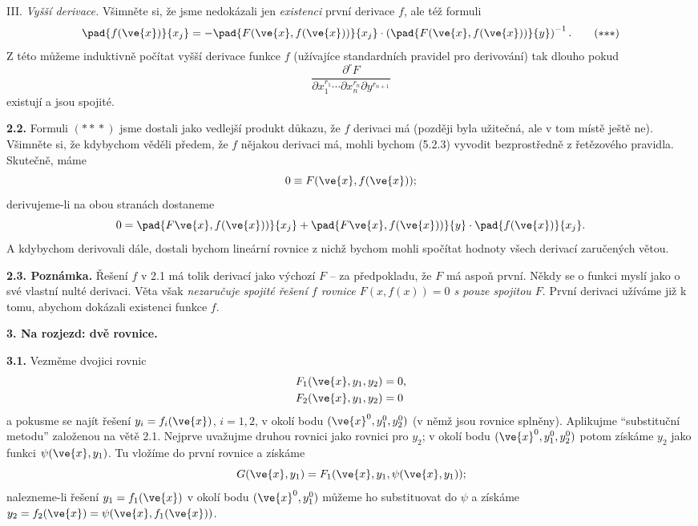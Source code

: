 \documentclass[12pt]{article}
\begin{document}
{\smallskip

III. {\em Vyšší derivace.} Všimněte si, že jsme nedokázali jen 
 {\em existenci} první derivace
 $f$, ale též formuli
\begin{equation}
\pad{f(\ve{x})}{x_j}=-\pad{F(\ve{x},f(\ve{x}))}{x_j}\cdot\left(\pad{F(\ve{x},f(\ve{x}))}{y}\right)^{-1}. \tag{${**}*$}
\end{equation}
Z této můžeme induktivně počítat vyšší derivace funkce $f$ (užívajíce standardních pravidel pro derivování) 
tak dlouho pokud
$$\frac{\partial^r F}{\partial x_1^{r_1}\cdots\partial x_n^{r_n}\partial y^{r_{n+1}}}$$ 
existují a jsou spojité. \sq

\bigskip 

{\bf 2.2.} Formuli \hbox{$({**}*)$} jsme dostali jako vedlejší produkt důkazu, že $f$ derivaci má (později byla užitečná, ale v tom místě ještě ne). Všimněte si, že kdybychom věděli předem, že 
 $f$ nějakou derivaci má, mohli bychom (5.2.3) vyvodit bezprostředně z řetězového pravidla. Skutečně, máme
$$
0\equiv F(\ve{x},f(\ve{x}));
$$
derivujeme-li na obou stranách dostaneme
$$
0=\pad{F\ve{x},f(\ve{x}))}{x_j}+\pad{F\ve{x},f(\ve{x}))}{y}\cdot\pad{f(\ve{x})}{x_j}.
$$
A kdybychom derivovali dále, dostali  bychom lineární rovnice z nichž bychom mohli spočítat
 hodnoty všech derivací zaručených větou.

\medskip


{\bf 2.3. Poznámka.} Řešení $f$ v 2.1  
má tolik derivací jako výchozí $F$ -- za předpokladu, že $F$ má aspoň první.
Někdy se o funkci myslí jako o své vlastní nulté derivaci. 
 Věta však  {\em nezaručuje
spojité řešení $f$ rovnice $F(x,f(x))=0$ s pouze spojitou $F$}. 
První derivaci užíváme již k tomu, abychom dokázali existenci funkce $f$.




 \vskip10mm
 
  
 {\large\bf 3. Na rozjezd: dvě rovnice.}
 
 \bigskip
 
{\bf 3.1.}
 Vezměme dvojici rovnic
$$
\begin{aligned}
&F_1(\ve{x},y_1,y_2)=0,\\
&F_2(\ve{x},y_1,y_2)=0
\end{aligned}
$$
a pokusme se najít řešení $y_i=f_i(\ve{x})$, $i=1,2$,
v okolí bodu $(\ve{x}^0,y^0_1,y^0_2)$ (v němž jsou rovnice splněny). 
Aplikujme ``substituční metodu'' založenou na větě 2.1. 
Nejprve uvažujme druhou rovnici jako rovnici pro
 $y_2$; v okolí bodu $(\ve{x}^0,y_1^0,y_2^0)$ potom získáme
 $y_2$ jako funkci $\psi(\ve{x},y_1)$. Tu vložíme do první rovnice 
a získáme
$$
G(\ve{x},y_1)=F_1(\ve{x},y_1,\psi(\ve{x},y_1));
$$
nalezneme-li řešení $y_1=f_1(\ve{x})$  v okolí bodu  $(\ve{x}^0,y^0_1)$ můžeme ho substituovat do $\psi$ a
získáme
$y_2=f_2(\ve{x})=\psi(\ve{x},f_1(\ve{x}))$.

}
\end{document}
